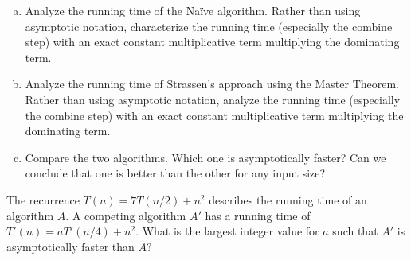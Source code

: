 \documentclass{common/cs157}
\begin{document}
\begin{problem}{1}
\begin{enumerate}[(a)]
    \item Analyze the running time of the Na\"ive algorithm. Rather than using asymptotic notation, characterize the running time (especially the combine step) with an exact constant multiplicative term multiplying the dominating term.
    \item Analyze the running time of  Strassen’s approach using the Master Theorem. Rather than using asymptotic notation, analyze the running time (especially the combine step)  with an exact constant multiplicative term multiplying the dominating term.
    \item Compare the two algorithms. Which one is asymptotically faster? Can we conclude that one is better than the other for any input size?
\end{enumerate}
\end{problem}

\newpage

\begin{problem}{2}
The recurrence $T(n) = 7T(n/2) + n^2$ describes the running time of an algorithm $A$. A competing algorithm $A'$ has a running time of $T'(n) = aT'(n/4) + n^2$. What is the largest integer value for $a$ such that $A'$ is asymptotically faster than $A$?
\end{problem}
\end{document}
